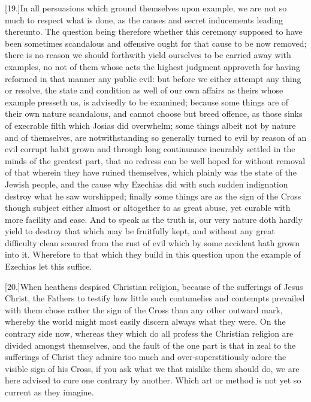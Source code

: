 [19.]In all persuasions which ground themselves upon example, we are not so much to respect what is done, as the causes and secret inducements leading thereunto. The question being therefore whether this ceremony supposed to have  been sometimes scandalous and offensive ought for that cause to be now removed;
 there is no reason we should forthwith yield ourselves to be carried away with examples, no not of them whose acts the highest judgment approveth for having reformed in that manner any public evil: but before we either attempt any thing or resolve, the state and condition as well of our own affairs as theirs whose example presseth us, is advisedly to be examined; because some things are of their own nature scandalous, and cannot choose but breed offence, as those sinks of execrable filth which Josias did overwhelm; some things albeit not by nature and of themselves, are notwithstanding so generally turned to evil by reason of an evil corrupt habit grown and through long continuance incurably settled in the minds of the greatest part, that no redress can be well hoped for without removal of that wherein they have ruined themselves, which plainly was the state of the Jewish people, and the cause why Ezechias did with such sudden indignation destroy what he saw worshipped; finally some things are as the sign of the Cross though subject either almost or altogether to as great abuse, yet curable with more facility and ease. And to speak as the truth is, our very nature doth hardly yield to destroy that which may be fruitfully kept, and without any great difficulty clean scoured from the rust of evil which by some accident hath grown into it. Wherefore to that which they build in this question upon the example of Ezechias let this suffice.

[20.]When heathens despised Christian religion, because of the sufferings of Jesus Christ, the Fathers to testify how little such contumelies and contempts prevailed with them chose rather the sign of the Cross than any other outward mark, whereby the world might most easily discern always what they were. On the contrary side now, whereas they which do all profess the Christian religion are divided amongst themselves, and the fault of the one part is that in zeal to the sufferings of Christ they admire too much and over-superstitiously adore the visible sign of his Cross, if you ask what we that mislike them should do, we are here advised to cure one contrary by another. Which art or method is not yet so current as they imagine.




